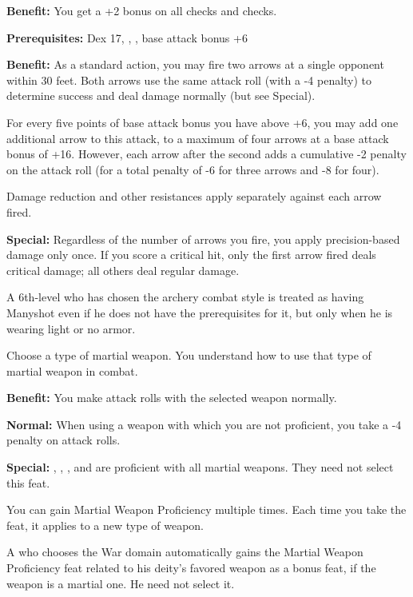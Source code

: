 \textbf{Benefit:} You get a +2 bonus on all  checks and  
checks.


\textbf{Prerequisites:} Dex 17, , , base attack bonus 
+6

\textbf{Benefit:} As a standard action, you may fire two arrows at a single opponent 
within 30 feet. Both arrows use the same attack roll (with a -4 penalty) to determine 
success and deal damage normally (but see Special).

For every five points of base attack bonus you have above +6, you may add one additional 
arrow to this attack, to a maximum of four arrows at a base attack bonus of +16. 
However, each arrow after the second adds a cumulative -2 penalty on the attack 
roll (for a total penalty of -6 for three arrows and -8 for four).

Damage reduction and other resistances apply separately against each arrow fired.

\textbf{Special:} Regardless of the number of arrows you fire, you apply precision-based 
damage only once. If you score a critical hit, only the first arrow fired deals 
critical damage; all others deal regular damage.

A 6th-level  who has chosen the archery combat style is treated as having 
Manyshot even if he does not have the prerequisites for it, but only when he is 
wearing light or no armor.


Choose a type of martial weapon. You understand how to use that type of martial 
weapon in combat.

\textbf{Benefit:} You make attack rolls with the selected weapon normally.

\textbf{Normal:} When using a weapon with which you are not proficient, you take 
a -4 penalty on attack rolls.

\textbf{Special:} , , , and  are proficient with 
all martial weapons. They need not select this feat.

You can gain Martial Weapon Proficiency multiple times. Each time you take the 
feat, it applies to a new type of weapon. 

A  who chooses the War domain automatically gains the Martial Weapon Proficiency 
feat related to his deity's favored weapon as a bonus feat, if the weapon is a 
martial one. He need not select it.

